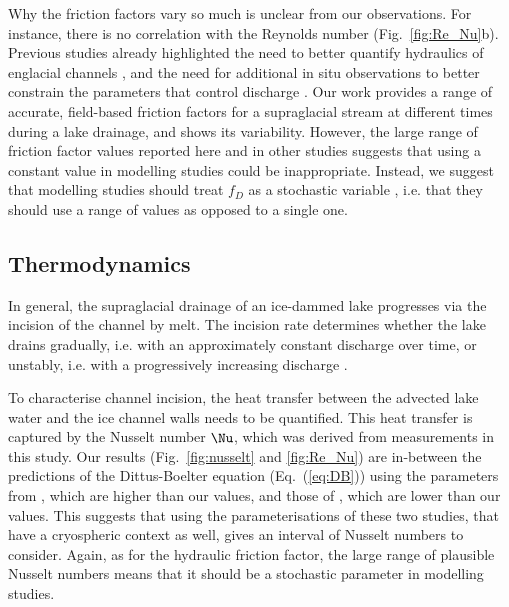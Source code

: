 Why the friction factors vary so much is unclear from our observations. For instance, there is no correlation with the Reynolds number (Fig.~\ref{fig:Re_Nu}b). Previous studies already highlighted the need to better quantify hydraulics of englacial channels \citep[e.g.][]{Clarke2003, Gleason&al2016}, and the need for additional in situ observations to better constrain the parameters that control  discharge \citep[e.g.][]{Kingslake&al2015, Smith&al2015}. Our work provides a range of accurate, field-based friction factors for a supraglacial stream at different times during a lake drainage, and shows its variability.
%
However, the large range of friction factor values reported here and in other studies suggests that using a constant value in modelling studies could be inappropriate.
Instead, we suggest that modelling studies should treat $f_D$ as a stochastic variable \citep[e.g.][]{Brinkerhoff&al2021,Irarrazaval&al2021}, i.e. that they should use a range of values as opposed to a single one.

\subsection{Thermodynamics}
\label{sec:thermodynamics_discussion}

In general, the supraglacial drainage of an ice-dammed lake progresses via the incision of the channel by melt. The incision rate determines whether the lake drains gradually, i.e. with an approximately constant discharge over time, or unstably, i.e. with a progressively increasing discharge \citep{Raymond&Nolan2000}.

To characterise channel incision, the heat transfer between the advected lake water and the ice channel walls needs to be quantified.  This heat transfer is captured by the Nusselt number $\Nu$, which was derived from measurements in this study. Our results (Fig.~\ref{fig:nusselt} and \ref{fig:Re_Nu}) are in-between the predictions of the Dittus-Boelter equation (Eq.~(\ref{eq:DB})) using the parameters from \cite{Vincent&al2010}, which are higher than our values, and those of \cite{Lunardini&al1986}, which are lower than our values.
This suggests that using the parameterisations of these two studies, that have a cryospheric context as well, gives an interval of Nusselt numbers to consider.  Again, as for the hydraulic friction factor, the large range of plausible Nusselt numbers means that it should be a stochastic parameter in modelling studies.

